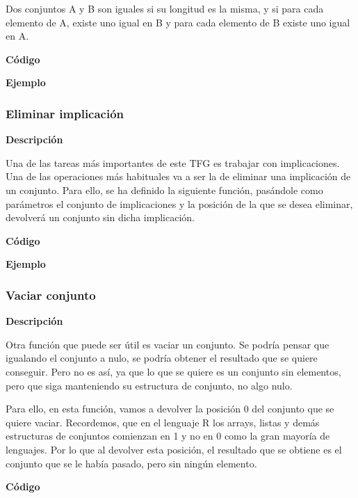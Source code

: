     Dos conjuntos A y B son iguales si su longitud es la misma, y si para cada elemento de A, existe uno igual 
    en B y para cada elemento de B existe uno igual en A.

    \textbf{C\'odigo}


    \textbf{Ejemplo}




\subsubsection{Eliminar implicaci\'on}

    \textbf{Descripci\'on}

    Una de las tareas m\'as importantes de este TFG es trabajar con implicaciones. Una de las operaciones m\'as habituales 
    va a ser la de eliminar una implicaci\'on de un conjunto. Para ello, se ha definido la siguiente funci\'on, pas\'andole 
    como par\'ametros el conjunto de implicaciones y la posici\'on de la que se desea eliminar, devolver\'a un conjunto sin 
    dicha implicaci\'on.

    \textbf{C\'odigo}


    \textbf{Ejemplo}



\subsubsection{Vaciar conjunto}

    \textbf{Descripci\'on}

    Otra funci\'on que puede ser \'util es vaciar un conjunto. Se podr\'ia pensar que igualando el conjunto a nulo, 
    se podr\'ia obtener el resultado que se quiere conseguir. Pero no es as\'i, ya que lo que se quiere es un conjunto sin 
    elementos, pero que siga manteniendo su estructura de conjunto, no algo nulo. 
    
    Para ello, en esta funci\'on, vamos a devolver la posici\'on 0 del conjunto que se quiere vaciar. Recordemos, que en el 
    lenguaje R los arrays, listas y dem\'as estructuras de conjuntos comienzan en 1 y no en 0 como la gran mayor\'ia de lenguajes.
    Por lo que al devolver esta posici\'on, el resultado que se obtiene es el conjunto que se le hab\'ia pasado, pero sin ning\'un 
    elemento.

    \textbf{C\'odigo}


